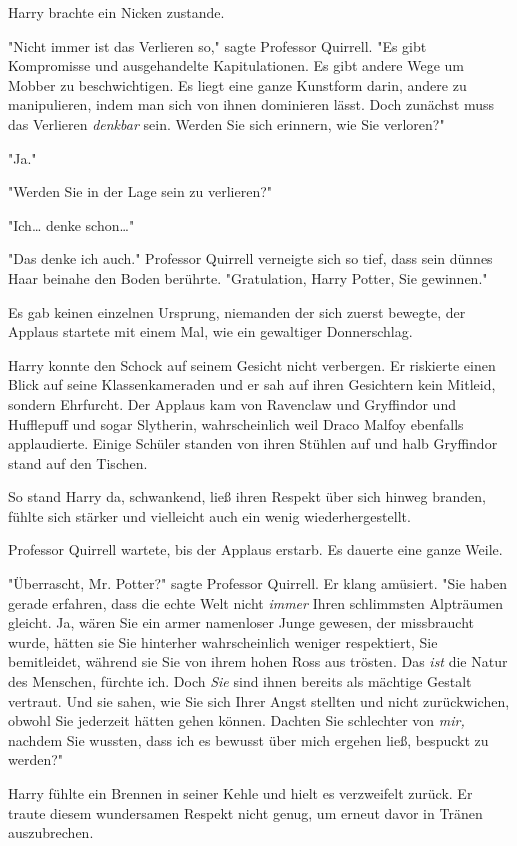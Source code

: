 {Harry brachte ein Nicken zustande.

"Nicht immer ist das Verlieren so," sagte Professor Quirrell. "Es gibt Kompromisse und ausgehandelte Kapitulationen. Es gibt andere Wege um Mobber zu beschwichtigen. Es liegt eine ganze Kunstform darin, andere zu manipulieren, indem man sich von ihnen dominieren lässt. Doch zunächst muss das Verlieren \emph{denkbar} sein. Werden Sie sich erinnern, wie Sie verloren?"

"Ja."

"Werden Sie in der Lage sein zu verlieren?"

"Ich… denke schon…"

"Das denke ich auch." Professor Quirrell verneigte sich so tief, dass sein dünnes Haar beinahe den Boden berührte. "Gratulation, Harry Potter, Sie gewinnen."

Es gab keinen einzelnen Ursprung, niemanden der sich zuerst bewegte, der Applaus startete mit einem Mal, wie ein gewaltiger Donnerschlag.

Harry konnte den Schock auf seinem Gesicht nicht verbergen. Er riskierte einen Blick auf seine Klassenkameraden und er sah auf ihren Gesichtern kein Mitleid, sondern Ehrfurcht. Der Applaus kam von Ravenclaw und Gryffindor und Hufflepuff und sogar Slytherin, wahrscheinlich weil Draco Malfoy ebenfalls applaudierte. Einige Schüler standen von ihren Stühlen auf und halb Gryffindor stand auf den Tischen.

So stand Harry da, schwankend, ließ ihren Respekt über sich hinweg branden, fühlte sich stärker und vielleicht auch ein wenig wiederhergestellt.

Professor Quirrell wartete, bis der Applaus erstarb. Es dauerte eine ganze Weile.

"Überrascht, Mr. Potter?" sagte Professor Quirrell. Er klang amüsiert. "Sie haben gerade erfahren, dass die echte Welt nicht \emph{immer} Ihren schlimmsten Alpträumen gleicht. Ja, wären Sie ein armer namenloser Junge gewesen, der missbraucht wurde, hätten sie Sie hinterher wahrscheinlich weniger respektiert, Sie bemitleidet, während sie Sie von ihrem hohen Ross aus trösten. Das \emph{ist} die Natur des Menschen, fürchte ich. Doch \emph{Sie} sind ihnen bereits als mächtige Gestalt vertraut. Und sie sahen, wie Sie sich Ihrer Angst stellten und nicht zurückwichen, obwohl Sie jederzeit hätten gehen können. Dachten Sie schlechter von \emph{mir,} nachdem Sie wussten, dass ich es bewusst über mich ergehen ließ, bespuckt zu werden?"

Harry fühlte ein Brennen in seiner Kehle und hielt es verzweifelt zurück. Er traute diesem wundersamen Respekt nicht genug, um erneut davor in Tränen auszubrechen.

}
